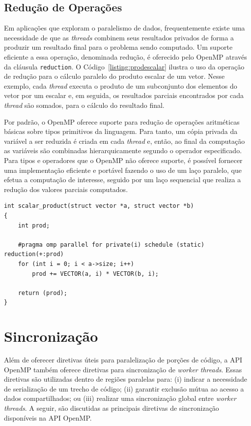 \documentclass{SBCbookchapter}
\begin{document}
	\subsection{Redução de Operações}
	\label{subsection: reducao de operacoes}

		Em aplicações que exploram o paralelismo de dados,
		frequentemente existe uma necessidade de que as \textit{threads}
		combinem seus resultados privados de forma a produzir um
		resultado final para o problema sendo computado. Um suporte
		eficiente a essa operação, denominada redução, é oferecido pelo
		OpenMP através da cláusula \texttt{reduction}. O Código~\ref{listing:prodescalar}
		ilustra o uso da operação de redução para o cálculo
		paralelo do produto escalar de um vetor. Nesse exemplo, cada
		\textit{thread} executa o produto de um subconjunto dos
		elementos do vetor por um escalar e, em seguida, os resultados
		parciais encontrados por cada \textit{thread} são somados, para
		o cálculo do resultado final.

		Por padrão, o OpenMP oferece suporte  para redução de operações
		aritméticas básicas sobre tipos primitivos da linguagem. Para
		tanto, um cópia privada da variável a ser reduzida é criada em
		cada \textit{thread} e, então, ao final da computação as
		variáveis são combinadas hierarquicamente segundo o operador
		especificado. Para tipos e operadores que o OpenMP não oferece
		suporte, é possível fornecer uma implementação eficiente e
		portável fazendo o uso de um laço paralelo, que efetua a
		computação de interesse, seguido por um laço sequencial que
		realiza a redução dos valores parciais computados.

\begin{lstlisting}[frame=single, caption=Produto escalar.,
label=listing:prodescalar]
int scalar_product(struct vector *a, struct vector *b)
{
	int prod;

	#pragma omp parallel for private(i) schedule (static) reduction(+:prod)
	for (int i = 0; i < a->size; i++)
		prod += VECTOR(a, i) * VECTOR(b, i);
	
	return (prod);
}
\end{lstlisting}


\section{Sincronização}
\label{section: sincronizacao}

	Além de oferecer diretivas úteis para paralelização de porções de código, a API
	OpenMP também oferece diretivas para sincronização de \textit{worker threads}. Essas
	diretivas são utilizadas dentro de regiões paralelas para: (i) indicar a necessidade de serialização
	de um trecho de código; (ii) garantir exclusão mútua ao acesso a dados compartilhados; ou
	(iii) realizar uma sincronização global entre \textit{worker threads}. A seguir, são discutidas
	as principais diretivas de sincronização disponíveis na API OpenMP.
	
\end{document}
